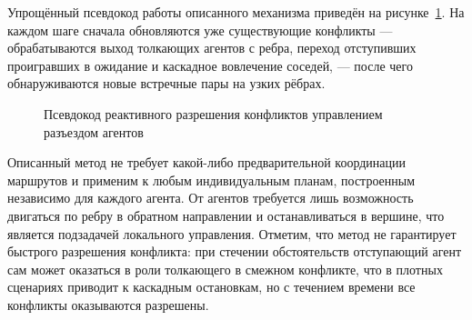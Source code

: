 Упрощённый псевдокод работы описанного механизма приведён на
рисунке~\ref{alg:reverse}. На каждом шаге сначала обновляются уже существующие конфликты ---
обрабатываются выход толкающих агентов с ребра, переход отступивших проигравших в ожидание и
каскадное вовлечение соседей, --- после чего обнаруживаются новые встречные пары на узких рёбрах.

\begin{figure}
\begin{minipage}{\linewidth}
\begin{algorithm}[H]
    \SetAlgoVlined
\end{algorithm}
\end{minipage}
\caption{Псевдокод реактивного разрешения конфликтов управлением разъездом агентов}
\label{alg:reverse}
\end{figure}

Описанный метод не требует какой-либо предварительной координации маршрутов и применим к любым
индивидуальным планам, построенным независимо для каждого агента. От агентов требуется лишь
возможность двигаться по ребру в обратном направлении и останавливаться в вершине, что является
подзадачей локального управления. Отметим, что метод не гарантирует быстрого разрешения конфликта: 
при стечении обстоятельств отступающий агент сам может оказаться в роли толкающего в
смежном конфликте, что в плотных сценариях приводит к каскадным остановкам, но с течением времени все 
конфликты оказываются разрешены.

